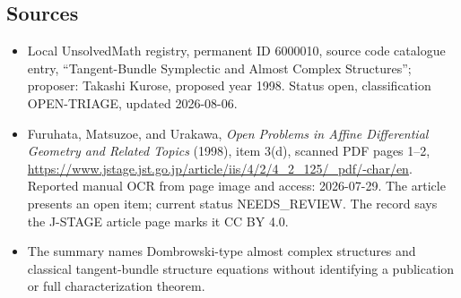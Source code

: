 \documentclass[11pt]{article}
\begin{document}
\subsection{Sources}
\begin{itemize}
\item Local UnsolvedMath registry, permanent ID 6000010, source code catalogue entry, ``Tangent-Bundle Symplectic and Almost Complex Structures''; proposer: Takashi Kurose, proposed year 1998. Status open, classification OPEN-TRIAGE, updated 2026-08-06.
\item Furuhata, Matsuzoe, and Urakawa, \emph{Open Problems in Affine Differential Geometry and Related Topics} (1998), item 3(d), scanned PDF pages 1--2, \url{https://www.jstage.jst.go.jp/article/iis/4/2/4_2_125/_pdf/-char/en}. Reported manual OCR from page image and access: 2026-07-29. The article presents an open item; current status NEEDS\_REVIEW. The record says the J-STAGE article page marks it CC BY 4.0.
\item The summary names Dombrowski-type almost complex structures and classical tangent-bundle structure equations without identifying a publication or full characterization theorem.
\end{itemize}
\end{document}

